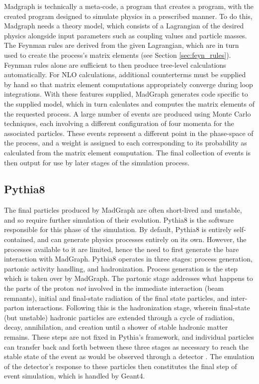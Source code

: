     Madgraph is technically a meta-code, a program that creates a program,
        with the created program designed to simulate physics in a prescribed manner.
    To do this, Madgraph needs a theory model, which consists of a Lagrangian of the desired physics
        alongside input parameters such as coupling values and particle masses.
    The Feynman rules are derived from the given Lagrangian,
        which are in turn used to create the process's matrix elements (see Section \ref{sec:feyn_rules}).
    Feynman rules alone are sufficient to then produce tree-level calculations automatically.
    For NLO calculations, additional counterterms must be supplied by hand
        so that matrix element computations appropriately converge during loop integrations. 
    With these features supplied, MadGraph generates code specific to the supplied model,
        which in turn calculates and computes the matrix elements of the requested process\cite{madgraph}.
    A large number of events are produced using Monte Carlo techniques,
        each involving a different configuration of four momenta for the associated particles.
    These events represent a different point in the phase-space of the process,
        and a weight is assigned to each corresponding to its probability as calculated from the matrix element computation.
    The final collection of events is then output for use by later stages of the simulation process.

    \subsection{Pythia8}

    The final particles produced by MadGraph are often short-lived and unstable,
        and so require further simulation of their evolution.
    Pythia8 is the software responsible for this phase of the simulation. 
    By default, Pythia8 is entirely self-contained, and can generate physics processes entirely on its own.
    However, the processes available to it are limited,
        hence the need to first generate the bare interaction with MadGraph.
    Pythia8 operates in three stages: process generation, partonic activity handling, and hadronization.
    Process generation is the step which is taken over by MadGraph.
    The partonic stage addresses what happens to the parts of the proton \textit{not} involved in the immediate interaction (beam remnants),
        initial and final-state radiation of the final state particles, and inter-parton interactions.
    Following this is the hadronization stage, wherein final-state (but unstable)
        hadronic particles are extended through a cycle of radiation, decay, annihilation, and creation
        until a shower of stable hadronic matter remains.
    These steps are not fixed in Pythia's framework,
        and individual particles can transfer back and forth between these three stages
        as necessary to reach the stable state of the event as would be observed through a detector
        \cite{pythia}.
    The emulation of the detector's response to these particles then constitutes the final step of event simulation,
        which is handled by Geant4.

